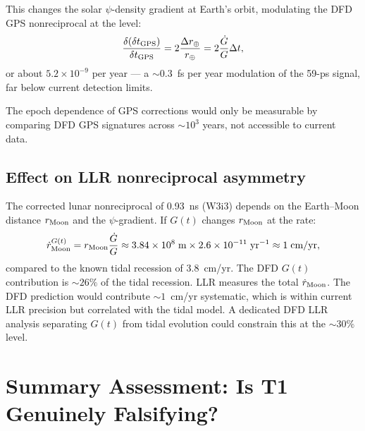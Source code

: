 \documentclass[aps,prd,twocolumn,superscriptaddress,nofootinbib,longbibliography]{revtex4-2}
\newcommand{\ee}[1]{\times 10^{#1}}
\begin{document}
This changes the solar $\psi$-density gradient at Earth's orbit, modulating
the DFD GPS nonreciprocal at the level:
\begin{equation}
\frac{\delta(\delta t_{\rm GPS})}{\delta t_{\rm GPS}} = 2\frac{\Delta r_\oplus}{r_\oplus}
= 2\frac{\dot{G}}{G}\Delta t,
\label{eq:GPS-Gdot}
\end{equation}
or about $5.2\ee{-9}$ per year --- a $\sim 0.3$~fs per year modulation of the
59-ps signal, far below current detection limits.

The epoch dependence of GPS corrections would only be measurable by comparing
DFD GPS signatures across $\sim\!10^3$ years, not accessible to current data.

\subsection{Effect on LLR nonreciprocal asymmetry}

The corrected lunar nonreciprocal of 0.93~ns (W3i3) depends on the
Earth--Moon distance $r_{\rm Moon}$ and the $\psi$-gradient.  If $G(t)$
changes $r_{\rm Moon}$ at the rate:
\begin{equation}
\dot{r}_{\rm Moon}^{G(t)} = r_{\rm Moon}\frac{\dot{G}}{G}
\approx 3.84\ee{8}\;\text{m}\times 2.6\ee{-11}\;\text{yr}^{-1}
\approx 1\;\text{cm/yr},
\label{eq:Moon-rdot-Gt}
\end{equation}
compared to the known tidal recession of $3.8$~cm/yr.  The DFD $G(t)$
contribution is $\sim 26\%$ of the tidal recession.  LLR measures the total
$\dot{r}_{\rm Moon}$.  The DFD prediction would contribute $\sim 1$~cm/yr
systematic, which is within current LLR precision but correlated with the
tidal model.  A dedicated DFD LLR analysis separating $G(t)$ from tidal
evolution could constrain this at the $\sim\!30\%$ level.

\section{Summary Assessment: Is T1 Genuinely Falsifying?}
\label{sec:verdict}
\end{document}
